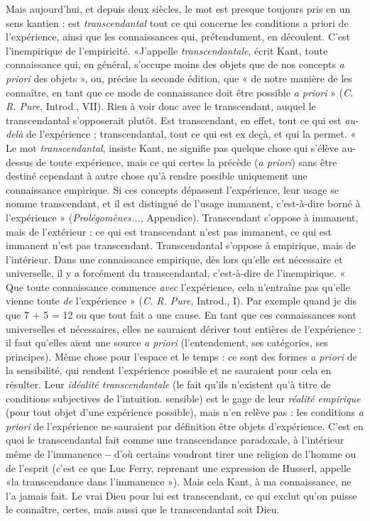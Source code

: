 Mais aujourd’hui, et depuis deux siècles, le mot est presque toujours pris en
un sens kantien : est {\it transcendantal} tout ce qui concerne les conditions a priori de
l'expérience, ainsi que les connaissances qui, prétendument, en découlent. C’est
l’inempirique de l'empiricité. «J'appelle {\it transcendantale}, écrit Kant, toute
connaissance qui, en général, s’occupe moins des objets que de nos concepts {\it a
priori} des objets », ou, précise la seconde édition, que « de notre manière de les
connaître, en tant que ce mode de connaissance doit être possible {\it a priori} »
({\it C. R. Pure}, Introd., VII). Rien à voir donc avec le transcendant, auquel le transcendantal
s’opposerait plutôt. Est transcendant, en effet, tout ce qui est {\it au-delà}
de l’expérience ; transcendantal, tout ce qui est ex deçà, et qui la permet. « Le mot
{\it transcendantal}, insiste Kant, ne signifie pas quelque chose qui s’élève au-dessus de
toute expérience, mais ce qui certes la précède ({\it a priori}) sans être destiné cependant
à autre chose qu’à rendre possible uniquement une connaissance empirique.
Si ces concepts dépassent l’expérience, leur usage se nomme transcendant, et il est
distingué de l’usage immanent, c’est-à-dire borné à l’expérience » ({\it Prolégomènes...},
Appendice). Transcendant s'oppose à immanent, mais de l’extérieur :
ce qui est transcendant n’est pas immanent, ce qui est immanent n’est pas transcendant.
Transcendantal s'oppose à empirique, mais de l’intérieur. Dans une
connaissance empirique, dès lors qu’elle est nécessaire et universelle, il y a forcément
du transcendantal, c’est-à-dire de l’inempirique. « Que toute connaissance
commence {\it avec} l'expérience, cela n’entraîne pas qu’elle vienne toute {\it de}
l'expérience » ({\it C. R. Pure}, Introd., I). Par exemple quand je dis que 7 + 5 = 12 ou
que tout fait a une cause. En tant que ces connaissances sont universelles et nécessaires,
elles ne sauraient dériver tout entières de l’expérience : il faut qu’elles aient
une source {\it a priori} (l'entendement, ses catégories, ses principes). Même chose
pour l’espace et le temps : ce sont des formes {\it a priori} de la sensibilité, qui rendent
l'expérience possible et ne sauraient pour cela en résulter. Leur {\it idéalité transcendantale}
(le fait qu’ils n’existent qu’à titre de conditions subjectives de l'intuition.
sensible) est le gage de leur {\it réalité empirique} (pour tout objet d’une expérience
possible), mais n’en relève pas : les conditions {\it a priori} de l'expérience ne sauraient
par définition être objets d’expérience. C’est en quoi le transcendantal fait
comme une transcendance paradoxale, à l’intérieur même de l’immanence {\bf --} d’où
certains voudront tirer une religion de l’homme ou de l'esprit (c’est ce que Luc
Ferry, reprenant une expression de Husserl, appelle «la transcendance dans
l’immanence »). Mais cela Kant, à ma connaissance, ne l’a jamais fait. Le vrai
Dieu pour lui est transcendant, ce qui exclut qu’on puisse le connaître, certes,
mais aussi que le transcendantal soit Dieu.

